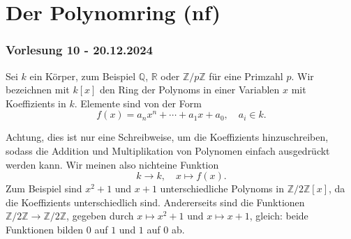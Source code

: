 \documentclass[9pt]{article}
\begin{document}
\section{Der Polynomring (nf)}
\subsubsection*{Vorlesung 10 - 20.12.2024}
Sei $k$ ein \Gls{Körper}, zum Beispiel $\mathbb{Q}$, $\mathbb{R}$ oder $\mathbb{Z}/p\mathbb{Z}$ für eine Primzahl $p$.  
Wir bezeichnen mit $k[x]$ den Ring der \glspl{Polynom} in einer Variablen $x$ mit \glspl{Koeffizient} in $k$.  
Elemente sind von der Form  
\[ f(x) = a_nx^n + \cdots + a_1x + a_0, \quad a_i \in k. \]
\begin{bem}
Achtung, dies ist nur eine Schreibweise, um die \glspl{Koeffizient} hinzuschreiben, sodass die Addition und Multiplikation von Polynomen einfach ausgedrückt werden kann.  
Wir meinen also nichteine Funktion  
\[ k \to k, \quad x \mapsto f(x). \]  
Zum Beispiel sind $x^2 + 1$ und $x + 1$ unterschiedliche \glspl{Polynom} in $\mathbb{Z}/2\mathbb{Z}[x]$, da die \glspl{Koeffizient} unterschiedlich sind.  
Andererseits sind die Funktionen $\mathbb{Z}/2\mathbb{Z} \to \mathbb{Z}/2\mathbb{Z}$, gegeben durch $x \mapsto x^2 + 1$ und $x \mapsto x + 1$, gleich: beide Funktionen bilden $0$ auf $1$ und $1$ auf $0$ ab.  


\end{bem}
\end{document}
